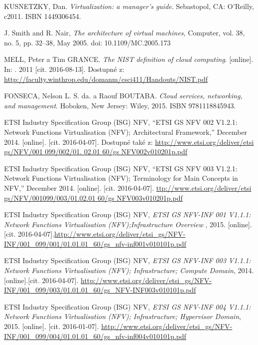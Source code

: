 \begin{thebibliography}{10}
KUSNETZKY, Dan. \emph{Virtualization: a manager's guide}. Sebastopol, CA: O'Reilly, c2011. ISBN 1449306454.

J. Smith and R. Nair, \emph{The architecture of virtual machines}, Computer, vol. 38, no. 5, pp. 32–38, May 2005. doi: 10.1109/MC.2005.173

MELL, Peter a Tim GRANCE. \emph{The NIST definition of cloud computing}. [online]. In: . 2011 [cit. 2016-08-13]. Dostupné z: \url{http://faculty.winthrop.edu/domanm/csci411/Handouts/NIST.pdf}

FONSECA, Nelson L. S. da. a Raouf BOUTABA. \emph{Cloud services, networking, and management}. Hoboken, New Jersey: Wiley, 2015. ISBN 9781118845943.


ETSI Industry Specification Group (ISG) NFV, “ETSI GS NFV 002 V1.2.1: Network Functions Virtualisation (NFV); Architectural Framework,” December 2014. [online]. [cit. 2016-04-07]. Dostupné také z: \url{http://www.etsi.org/deliver/etsi gs/NFV/001 099/002/01. 02.01 60/gs NFV002v010201p.pdf} 

ETSI Industry Specification Group (ISG) NFV, “ETSI GS NFV 003 V1.2.1: Network Functions Virtualisation (NFV); Terminology for Main Concepts in NFV,” December 2014. [online]. [cit. 2016-04-07]. \url{ttp://www.etsi.org/deliver/etsi gs/NFV/001099/003/01.02.01 60/gs NFV003v010201p.pdf}

ETSI Industry Specification Group (ISG) NFV, \emph{ETSI GS NFV-INF 001 V1.1.1: Network Functions Virtualisation (NFV);Infrastructure Overview }, 2015. [online]. [cit. 2016-04-07].\url{http://www.etsi.org/deliver/etsi_gs/NFV-INF/001_099/001/01.01.01_60/gs_nfv-inf001v010101p.pdf}

ETSI Industry Specification Group (ISG) NFV, \emph{ETSI GS NFV-INF 003 V1.1.1: Network Functions Virtualisation (NFV);
Infrastructure; Compute Domain}, 2014. [online].[cit. 2016-04-07]. \url{http://www.etsi.org/deliver/etsi_gs/NFV-INF/001_099/003/01.01.01_60/gs_NFV-INF003v010101p.pdf}

 ETSI Industry Specification Group (ISG) NFV, \emph{ETSI GS NFV-INF 004 V1.1.1: Network Functions Virtualisation (NFV); Infrastructure; Hypervisor Domain}, 2015. [online]. [cit. 2016-01-07]. \url{http://www.etsi.org/deliver/etsi_gs/NFV-INF/001_099/004/01.01.01_60/gs_nfv-inf004v010101p.pdf}


\end{thebibliography}
